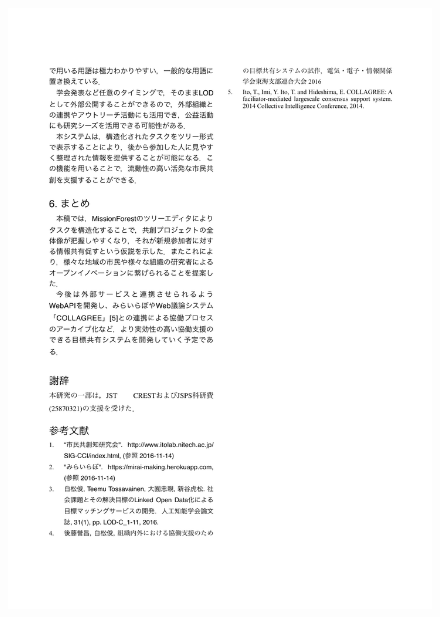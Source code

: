 \begin{figure}[ht]
    \begin{center}
        \includegraphics[width=1.0\linewidth]{assets/pdf/sig_cci2016_3.pdf}
    \end{center}
\end{figure}
\clearpage

\cleardoublepage
